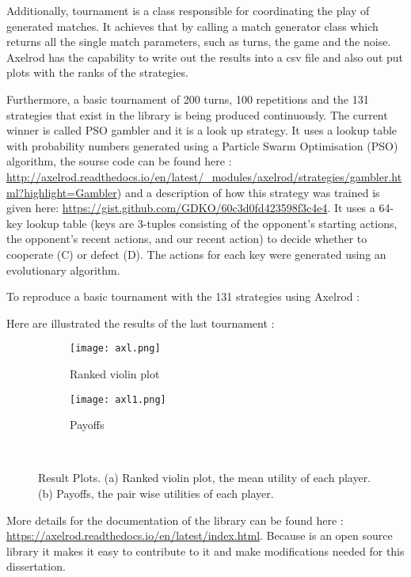 Additionally, tournament is a class responsible for coordinating the play of
generated matches. It achieves that by calling a match generator class which
returns all the single match parameters, such as turns, the game and the noise.
Axelrod has the capability to write out the results into a csv file and also out
put plots with the ranks of the strategies.

Furthermore, a basic tournament of 200 turns, 100 repetitions and the 131
strategies that exist in the library is being produced continuously. The current
winner is called PSO gambler and it is a look up strategy. It uses a lookup
table with probability numbers generated using a Particle Swarm Optimisation
(PSO) algorithm, the sourse code can be found here :
 \url{http://axelrod.readthedocs.io/en/latest/_modules/axelrod/strategies/gambler.html?highlight=Gambler})
 and a description of how this strategy was trained is given here:
 \url{https://gist.github.com/GDKO/60c3d0fd423598f3c4e4}.
It uses a 64-key lookup table (keys are 3-tuples consisting of the opponent's
starting actions, the opponent's recent actions, and our recent action) to
decide whether to cooperate (C) or defect (D). The actions for each key were
generated using an evolutionary algorithm.

To reproduce a basic tournament with the 131 strategies using Axelrod :


 Here are illustrated the results of the last tournament :
 \newpage

\begin{figure}[h]
\centering
    \begin{subfigure}[t]{0.7\textwidth}
    \centering
        \texttt{[image: axl.png]}
    \caption{Ranked violin plot}
    \end{subfigure}
\hfill
    \begin{subfigure}[t]{0.70\textwidth}\centering
    \centering
        \texttt{[image: axl1.png]}
    \caption{Payoffs}
    \end{subfigure}
~
\caption{Result Plots. (a) Ranked violin plot, the mean utility of each player.
(b) Payoffs, the pair wise utilities of each player.}
\label{fig:axelrodplots}
\end{figure}

More details for the documentation of the library can be found here :
\url{https://axelrod.readthedocs.io/en/latest/index.html}.
Because is an open source library it makes it easy to contribute to it and
make modifications needed for this dissertation.
